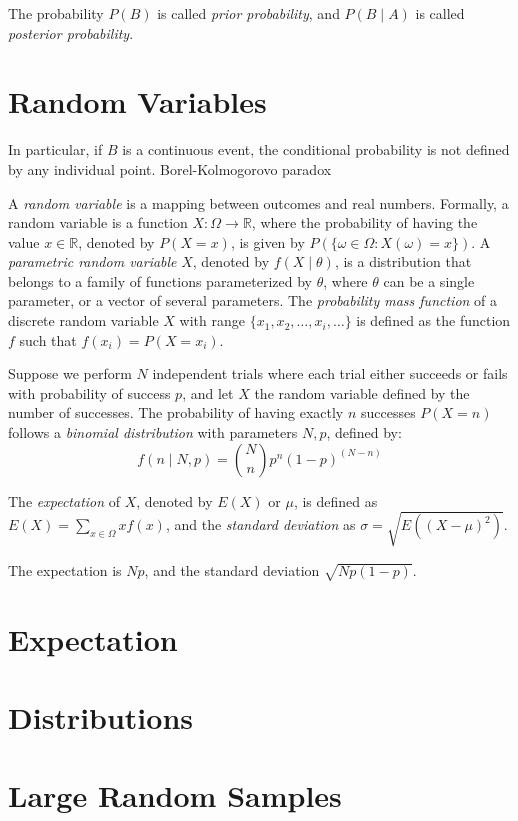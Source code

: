 The probability $P\left( B \right)$ is called \emph{prior probability}, and $P\left( B\mid A \right)$ is called \emph{posterior probability}.

%
%

\section{Random Variables}
\label{sec:probability_random_variables}

{\color{red} In particular, if $B$ is a continuous event, the conditional probability is not defined by any individual point. Borel-Kolmogorovo paradox}


A \emph{random variable} is a mapping between outcomes and real numbers. Formally, a random variable is a function $X : \Omega \rightarrow \mathbb{R}$, where the probability of having the value $x \in \mathbb{R}$, denoted by $P(X=x)$, is given by $P(\{ \omega \in \Omega : X(\omega) = x\})$. A \emph{parametric random variable} $X$, denoted by $f\left(X \mid \theta \right)$, is a distribution that belongs to a family of functions parameterized by $\theta$, where $\theta$ can be a single parameter, or a vector of several parameters. The \emph{probability mass function} of a discrete random variable $X$ with range $\{ x_1, x_2, \ldots, x_i, \ldots \}$ is defined as the function $f$ such that $f(x_i) = P(X=x_i)$.

\begin{example}
Suppose we perform $N$ independent trials where each trial either succeeds or fails with probability of success $p$, and let $X$ the random variable defined by the number of successes. The probability of having exactly $n$ successes $P(X=n)$ follows a \emph{binomial distribution} with parameters $N, p$, defined by:
\[
f(n\mid N, p) = \binom{N}{n} p^n (1-p)^{(N-n)}
\]
\end{example}

The \emph{expectation} of $X$, denoted by $E(X)$ or $\mu$, is defined as $E(X) = \sum_{x \in \Omega} x f(x)$, and the \emph{standard deviation} as $\sigma = \sqrt{E \left( (X - \mu)^2 \right)}$.

\begin{example}
The expectation is $Np$, and the standard deviation $\sqrt{Np(1-p)}$.
\end{example}

%
%

\section{Expectation}
\label{sec:probability_expectation}


%
%

\section{Distributions}
\label{sec:probability_distributions}


%
%

\section{Large Random Samples}
\label{sec:probability_random_samples}

